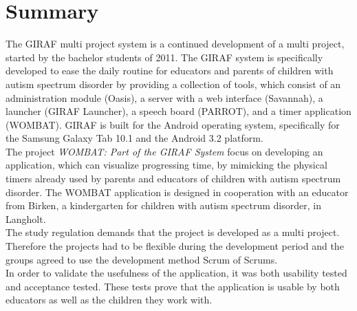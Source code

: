 \chapter*{Summary}
The GIRAF multi project system is a continued development of a multi project, started by the bachelor students of 2011. The GIRAF system is specifically developed to ease the daily routine for educators and parents of children with autism spectrum disorder by providing a collection of tools, which consist of an administration module (Oasis), a server with a web interface (Savannah), a launcher (GIRAF Launcher), a speech board (PARROT), and a timer application (WOMBAT). GIRAF is built for the Android operating system, specifically for the Samsung Galaxy Tab 10.1 and the Android 3.2 platform.\\

   The project \textit{WOMBAT: Part of the GIRAF System} focus on developing an application, which can visualize progressing time, by mimicking the physical timers already used by parents and educators of children with autism spectrum disorder. The WOMBAT application is designed in cooperation with an educator from Birken, a kindergarten for children with autism spectrum disorder, in Langholt.\\
	
	The study regulation demands that the project is developed as a multi project. Therefore the projects had to be flexible during the development period and the groups agreed to use the development method Scrum of Scrums.\\

   In order to validate the usefulness of the application, it was both usability tested and acceptance tested. These tests prove that the application is usable by both educators as well as the children they work with.
\clearpage